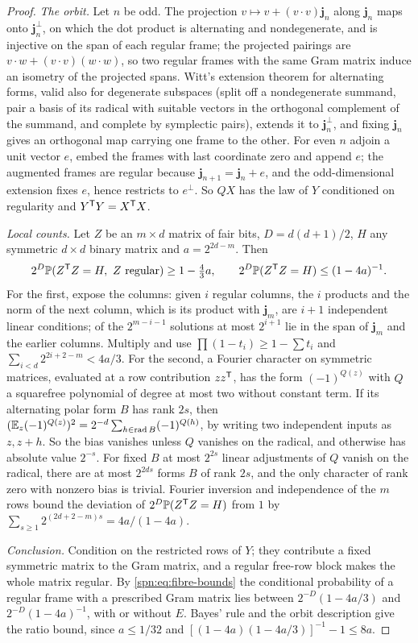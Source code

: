 \begin{proof}
\emph{The orbit.} Let $n$ be odd. The projection $v\mapsto v+(v\cdot v)\mathbf j_n$ along
$\mathbf j_n$ maps onto $\mathbf j_n^\perp$, on which the dot product is alternating and
nondegenerate, and is injective on the span of each regular frame; the projected pairings are
$v\cdot w+(v\cdot v)(w\cdot w)$, so two regular frames with the same Gram matrix induce an
isometry of the projected spans. Witt's extension theorem for alternating forms, valid also for
degenerate subspaces (split off a nondegenerate summand, pair a basis of its radical with
suitable vectors in the orthogonal complement of the summand, and complete by symplectic
pairs), extends it to $\mathbf j_n^\perp$, and fixing $\mathbf j_n$ gives an orthogonal map
carrying one frame to the other. For even $n$ adjoin a unit vector $e$, embed the frames with
last coordinate zero and append $e$; the augmented frames are regular because
$\mathbf j_{n+1}=\mathbf j_n+e$, and the odd-dimensional extension fixes $e$, hence restricts to
$e^\perp$. So $QX$ has the law of $Y$ conditioned on regularity and $Y^{\mathsf{T}}Y=X^{\mathsf{T}}X$.

\emph{Local counts.} Let $Z$ be an $m\times d$ matrix of fair bits, $D=d(d+1)/2$, $H$ any
symmetric $d\times d$ binary matrix and $a=2^{2d-m}$. Then
\begin{equation}\label{spn:eq:fibre-bounds}
 2^D\mathbb{P}(Z^{\mathsf{T}}Z=H,\ Z\text{ regular})\ge1-\tfrac43a,\qquad
 2^D\mathbb{P}(Z^{\mathsf{T}}Z=H)\le(1-4a)^{-1}.
\end{equation}
For the first, expose the columns: given $i$ regular columns, the $i$ products and the norm of
the next column, which is its product with $\mathbf j_m$, are $i+1$ independent linear
conditions; of the $2^{m-i-1}$ solutions at most $2^{i+1}$ lie in the span of $\mathbf j_m$ and
the earlier columns. Multiply and use $\prod(1-t_i)\ge1-\sum t_i$ and
$\sum_{i<d}2^{2i+2-m}<4a/3$. For the second, a Fourier character on symmetric matrices,
evaluated at a row contribution $zz^{\mathsf{T}}$, has the form $(-1)^{Q(z)}$ with $Q$ a
squarefree polynomial of degree at most two without constant term. If its alternating polar
form $B$ has rank $2s$, then $(\mathbb{E}_z(-1)^{Q(z)})^2=2^{-d}\sum_{h\in\operatorname{rad}B}(-1)^{Q(h)}$,
by writing two independent inputs as $z,z+h$. So the bias vanishes unless $Q$ vanishes on the
radical, and otherwise has absolute value $2^{-s}$. For fixed $B$ at most $2^{2s}$ linear
adjustments of $Q$ vanish on the radical, there are at most $2^{2ds}$ forms $B$ of rank $2s$,
and the only character of rank zero with nonzero bias is trivial. Fourier inversion and
independence of the $m$ rows bound the deviation of $2^D\mathbb{P}(Z^{\mathsf{T}}Z=H)$ from $1$ by
$\sum_{s\ge1}2^{(2d+2-m)s}=4a/(1-4a)$.

\emph{Conclusion.} Condition on the restricted rows of $Y$; they contribute a fixed symmetric
matrix to the Gram matrix, and a regular free-row block makes the whole matrix regular. By
\eqref{spn:eq:fibre-bounds} the conditional probability of a regular frame with a prescribed
Gram matrix lies between $2^{-D}(1-4a/3)$ and $2^{-D}(1-4a)^{-1}$, with or without $E$. Bayes'
rule and the orbit description give the ratio bound, since $a\le1/32$ and
$[(1-4a)(1-4a/3)]^{-1}-1\le8a$.
\end{proof}
